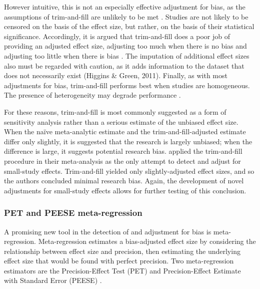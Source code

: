 \documentclass[man, mask]{apa6}
\begin{document}
However intuitive, this is not an especially effective adjustment for bias, as the assumptions of trim-and-fill are unlikely to be met \citep{Simonsohn:etal:2014b}. Studies are not likely to be censored on the basis of the effect size, but rather, on the basis of their statistical significance. Accordingly, it is argued that trim-and-fill does a poor job of providing an adjusted effect size, adjusting too much when there is no bias and adjusting too little when there is bias \citep{Simonsohn:etal:2014b}. %
The imputation of additional effect sizes also must be regarded with caution, as it adds information to the dataset that does not necessarily exist (Higgins \& Green, 2011). Finally, as with most adjustments for bias, trim-and-fill performs best when studies are homogeneous. The presence of heterogeneity may degrade performance \citep{Terrin:etal:2003}. %
\nocite{Higgins:Green:2011}

For these reasons, trim-and-fill is most commonly suggested as a form of sensitivity analysis rather than a serious estimate of the unbiased effect size. When the na{\"i}ve meta-analytic estimate and the trim-and-fill-adjusted estimate differ only slightly, it is suggested that the research is largely unbiased; when the difference is large, it suggests potential research bias.
\citet{Anderson:etal:2010} applied the trim-and-fill procedure in their meta-analysis as the only attempt to detect and adjust for small-study effects. Trim-and-fill yielded only slightly-adjusted effect sizes, and so the authors concluded minimal research bias.
Again, the development of novel adjustments for small-study effects allows for further testing of this conclusion.

\subsubsection{PET and PEESE meta-regression}
A promising new tool in the detection of and adjustment for bias is meta-regression. Meta-regression estimates a bias-adjusted effect size by considering the relationship between effect size and precision, then estimating the underlying effect size that would be found with perfect precision. Two meta-regression estimators are the Precision-Effect Test (PET) and Precision-Effect Estimate with Standard Error (PEESE) \citep{Stanley:Doucouliagos:2014}. %
\end{document}
